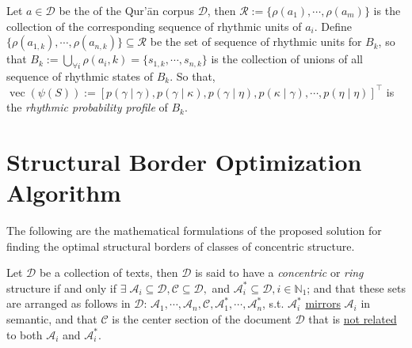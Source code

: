 \begin{defn}
    Let $a\in\mathscr{D}$ be the   of the Qur'\=an corpus $\mathscr{D}$, then $\mathscr{R}:=\{\rho(a_1),\cdots,\rho(a_m)\}$ is the collection of the corresponding sequence of rhythmic units of $a_i$. Define $\{\rho(a_{1,k}),\cdots,\rho(a_{n,k})\}\subseteq\mathscr{R}$ be the set of sequence of rhythmic units for   $B_k$, so that $B_k:=\bigcup_{\forall i} \rho(a_i,k)=\{s_{1,k},\cdots,s_{n,k}\}$ is the collection of unions of all sequence of rhythmic states of   $B_k$. So that, $\operatorname{vec}(\psi(S)):=[p(\gamma\mid\gamma),p(\gamma\mid\kappa),p(\gamma\mid\eta),p(\kappa\mid\gamma),\cdots,p(\eta\mid\eta)]^{\top}$ is the \textit{rhythmic probability profile} of   $B_k$.
\end{defn}
\section{Structural Border Optimization Algorithm}
The following are the mathematical formulations of the proposed solution for finding the optimal structural borders of classes of concentric structure.
\begin{defn}[\it Concentric]\label{defn:concentric}
    Let $\mathscr{D}$ be a collection of texts, then $\mathscr{D}$ is said to have a \textit{concentric} or \textit{ring} structure if and only if $\exists\;\mathscr{A}_i\subseteq\mathscr{D},\mathscr{C}\subseteq\mathscr{D},$ and $\mathscr{A}_i^{*}\subseteq\mathscr{D},i\in\mathbb{N}_1$; and that these sets are arranged as follows in $\mathscr{D}$:  $\mathscr{A}_1,\cdots,\mathscr{A}_n,\mathscr{C},\mathscr{A}_1^{*},\cdots,\mathscr{A}_n^{*}$, s.t. $\mathscr{A}_i^{*}$ \underline{mirrors} $\mathscr{A}_i$ in semantic, and that $\mathscr{C}$ is the center section of the document $\mathscr{D}$ that is \underline{not related} to both $\mathscr{A}_i$ and $\mathscr{A}_i^{*}$.
\end{defn}

